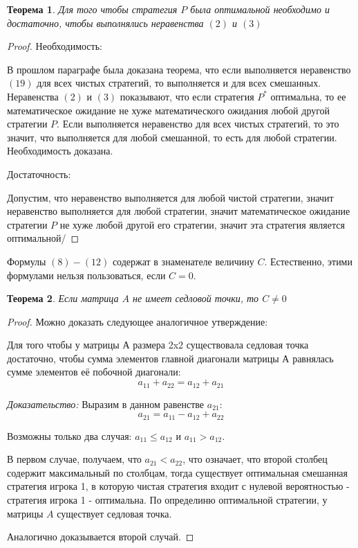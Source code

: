 \documentclass[aps,%
12pt,%
final,%
oneside,
onecolumn,%
musixtex, %
superscriptaddress,%
centertags]{article} %
\theoremstyle{plain}
\newtheorem{theorem}{Теорема}[section] %
\theoremstyle{definition}
\theoremstyle{remark}
\begin{document}
\begin{theorem}
  Для того чтобы стратегия $P$ была оптимальной необходимо и достаточно, чтобы выполнялись неравенства $(2)$ и $(3)$
\end{theorem}
\begin{proof}
  Необходимость:

  В прошлом параграфе была доказана теорема, что если выполняется неравенство $(19)$ для всех чистых стратегий, то выполняется и для всех смешанных. Неравенства $(2)$ и $(3)$ показывают, что если стратегия $P^*$ оптимальна, то ее математическое ожидание не хуже математического ожидания любой другой стратегии $P$. Если выполняется неравенство для всех чистых стратегий, то это значит, что выполняется для любой смешанной, то есть для любой стратегии. Необходимость доказана.

  Достаточность:

  Допустим, что неравенство выполняется для любой чистой стратегии, значит неравенство выполняется для любой стратегии, значит математическое ожидание стратегии $P$ не хуже любой другой его стратегии, значит эта стратегия является оптимальной/
\end{proof}

Формулы $(8) - (12)$ содержат в знаменателе величину $C$. Естественно, этими формулами нельзя пользоваться, если $C = 0$.

\begin{theorem}
  Если матрица $A$ не имеет седловой точки, то $C \neq 0$
\end{theorem}
\begin{proof}
  Можно доказать следующее аналогичное утверждение:

  Для того чтобы у матрицы А размера 2x2 существовала седловая точка достаточно, чтобы сумма элементов главной диагонали матрицы А равнялась сумме элементов её побочной диагонали:
  $$a_{11} + a_{22} = a_{12} + a_{21}$$

  \textit{Доказательство:}
  Выразим в данном равенстве $a_{21}$:
  $$a_{21} = a_{11} - a_{12} +a_{22}$$

  Возможны только два случая: $a_{11} \leq a_{12}$ и $a_{11} > a_{12}$.

  В первом случае, получаем, что $a_{21} < a_{22}$, что означает, что второй столбец содержит максимальный по столбцам, тогда существует оптимальная смешанная стратегия игрока 1, в которую чистая стратегия входит с нулевой вероятностью - стратегия игрока 1 - оптимальна. По определиню оптимальной стратегии, у матрицы $A$ существует седловая точка.

  Аналогично доказывается второй случай.
\end{proof}
\end{document}
